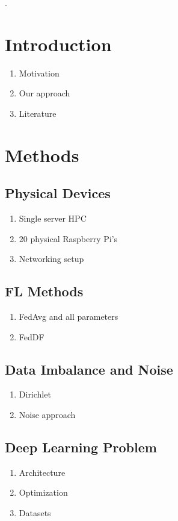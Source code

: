 \documentclass[12pt, fleqn]{article}
\begin{document}
\tableofcontents

\setlength{\headheight}{15pt}
\addtolength{\topmargin}{-2.5pt}.

\section{Introduction}
\label{sec:intro}
\begin{enumerate}
    \item Motivation
    \item Our approach
    \item Literature
\end{enumerate}


\section{Methods}%
\label{sec:methods}
\subsection{Physical Devices}
\begin{enumerate}
    \item Single server HPC 
    \item 20 physical Raspberry Pi's
    \item Networking setup
\end{enumerate}

\subsection{FL Methods}
\begin{enumerate}
    \item FedAvg and all parameters
    \item FedDF
\end{enumerate}

\subsection{Data Imbalance and Noise}
\begin{enumerate}
    \item Dirichlet
    \item Noise approach
\end{enumerate}

\subsection{Deep Learning Problem}
\begin{enumerate}
    \item Architecture
    \item Optimization
    \item Datasets
\end{enumerate}
\end{document}
